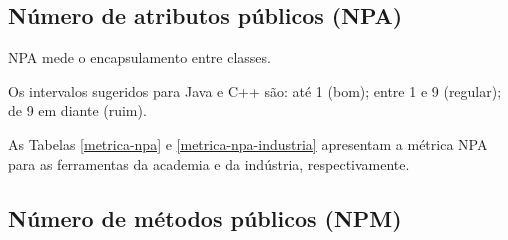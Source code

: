 
\subsection{Número de atributos públicos (NPA)}

NPA mede o encapsulamento entre classes.

Os intervalos sugeridos para Java e C++ são: até 1 (bom); entre 1 e 9
(regular); de 9 em diante (ruim).

As Tabelas \ref{metrica-npa} e \ref{metrica-npa-industria} apresentam a
métrica NPA para as ferramentas da academia e da indústria, respectivamente.



\subsection{Número de métodos públicos (NPM)}

